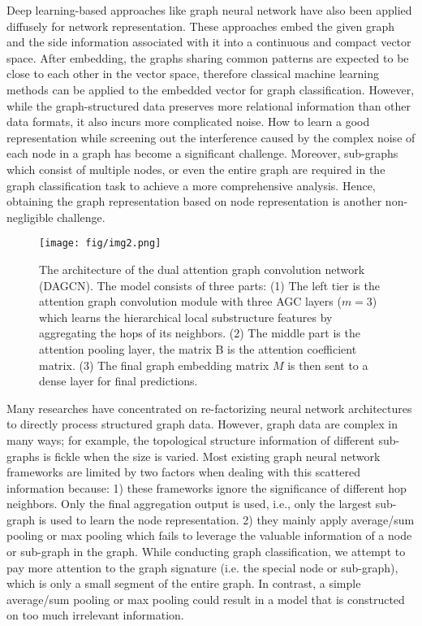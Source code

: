 \documentclass[conference]{IEEEtran}
\begin{document}
	     Deep learning-based approaches like graph neural network have also been applied diffusely for network representation. These approaches embed the given graph and the side information associated with it into a continuous and compact vector space. After embedding, the graphs sharing common patterns are expected to be close to each other in the vector space, therefore classical machine learning methods can be applied to the embedded vector for graph classification. However, while the graph-structured data preserves more relational information than other data formats, it also incurs more complicated noise. How to learn a good representation while screening out the interference caused by the complex noise of each node in a graph has become a significant challenge. Moreover, sub-graphs which consist of multiple nodes, or even the entire graph are required in the graph classification task to achieve a more comprehensive analysis. Hence, obtaining the graph representation based on node representation is another non-negligible challenge.
	     
	     \begin{figure*}
 	        \centering
 	        \texttt{[image: fig/img2.png]}
 	        \caption{The architecture of the dual attention graph convolution network (DAGCN). The model consists of three parts: (1) The left tier is the attention graph convolution module with three AGC layers ($m=3$) which learns the hierarchical local substructure features by aggregating the hops of its neighbors. (2) The middle part is the attention pooling layer, the matrix B is the attention coefficient matrix. (3) The final graph embedding matrix $M$ is then sent to a dense layer for final predictions.}   
 	        \label{fig:architecture}
 	        
	    \end{figure*}
	     
	     Many researches have concentrated on re-factorizing neural network architectures to directly process structured graph data\cite{monti2017geometricb,pan2016tri,defferrard2016convolutional,velickovic2017graph,pan2015finding}. However, graph data are complex in many ways; for example, the topological structure information of different sub-graphs is fickle when the size is varied. Most existing graph neural network frameworks are limited by two factors when dealing with this scattered information because: 1) these frameworks ignore the significance of different hop neighbors. Only the final aggregation output is used, i.e., only the largest sub-graph is used to learn the node representation. 2) they mainly apply average/sum pooling or max pooling which fails to leverage the valuable information of a node or sub-graph in the graph. While conducting graph classification, we attempt to pay more attention to the graph signature \cite{lee2018graph} (i.e. the special node or sub-graph), which is only a small segment of the entire graph. In contrast, a simple average/sum pooling or max pooling could result in a model that is constructed on too much irrelevant information. 
	     
\end{document}
